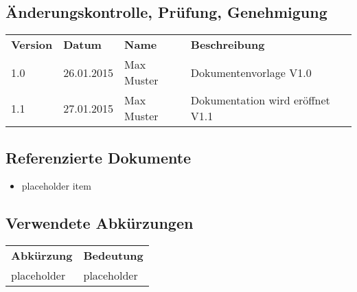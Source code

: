 \subsection{Änderungskontrolle, Prüfung, Genehmigung}
\begin{tabular}{l | l | l | l}
\textbf{Version} & \textbf{Datum} & \textbf{Name} & \textbf{Beschreibung} \\
1.0 & 26.01.2015 & Max Muster & Dokumentenvorlage V1.0 \\
1.1 & 27.01.2015 & Max Muster & Dokumentation wird eröffnet V1.1 \\

\end{tabular}

\subsection{Referenzierte Dokumente}
\begin{itemize}
\item placeholder item
\end{itemize}




\subsection{Verwendete Abkürzungen}
\begin{tabular}{l | l}
\textbf{Abkürzung} & \textbf{Bedeutung} \\
placeholder & placeholder \\
\end{tabular}